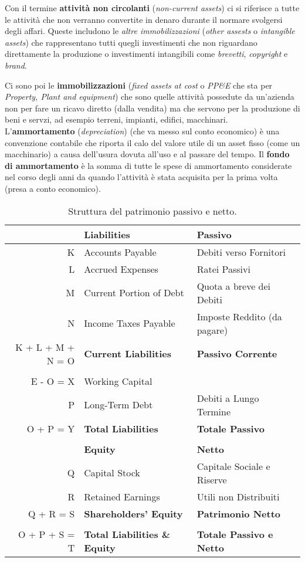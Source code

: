 \documentclass[a4paper,portrait,12pt]{article}
\theoremstyle{definition}
\begin{document}
Con il termine \textbf{attività non circolanti} (\emph{non-current assets}) ci si riferisce a tutte le attività che non verranno convertite in denaro durante il normare svolgersi degli affari.
Queste includono le \emph{altre immobilizzazioni} (\emph{other assests} o \emph{intangible assets}) che rappresentano tutti quegli investimenti che non riguardano direttamente la produzione o investimenti intangibili come \emph{brevetti}, \emph{copyright} e \emph{brand}.

Ci sono poi le \textbf{immobilizzazioni} (\emph{fixed assets at cost} o \emph{PP\&E} che sta per \emph{Property, Plant and equipment}) che sono quelle attività possedute da un'azienda non per fare un ricavo diretto (dalla vendita) ma che servono per la produzione di beni e servzi, ad esempio terreni, impianti, edifici, macchinari.\\

L'\textbf{ammortamento} (\emph{depreciation}) (che va messo sul conto economico) è una convenzione contabile che riporta il calo del valore utile di un asset fisso (come un macchinario) a causa dell'usura dovuta all'uso e al passare del tempo.
Il \textbf{fondo di ammortamento} è la somma di tutte le spese di ammortamento considerate nel corso degli anni da quando l'attività è stata acquisita per la prima volta (presa a conto economico).


\begin{table}[H]
\centering
\begin{tabular}{r|l|l}
 & \textbf{Liabilities} & \textbf{Passivo}\\
\hline
K & Accounts Payable & Debiti verso Fornitori\\
L & Accrued Expenses & Ratei Passivi\\
M & Current Portion of Debt & Quota a breve dei Debiti\\
N & Income Taxes Payable & Imposte Reddito (da pagare)\\
\hline
K + L + M + N = O & \textbf{Current Liabilities} & \textbf{Passivo Corrente}\\
 & &\\
E - O = X & Working Capital &\\
P & Long-Term Debt & Debiti a Lungo Termine\\
O + P = Y & \textbf{Total Liabilities} & \textbf{Totale Passivo}\\
 & &\\
 & \textbf{Equity} & \textbf{Netto}\\
\hline
Q & Capital Stock & Capitale Sociale e Riserve\\
R & Retained Earnings & Utili non Distribuiti\\
\hline
Q + R = S & \textbf{Shareholders' Equity} & \textbf{Patrimonio Netto}\\
 & &\\
\hline
O + P + S = T & \textbf{Total Liabilities \& Equity} & \textbf{Totale Passivo e Netto}\\
\hline
\end{tabular}
\caption{Struttura del patrimonio passivo e netto.}
\end{table}
\end{document}
